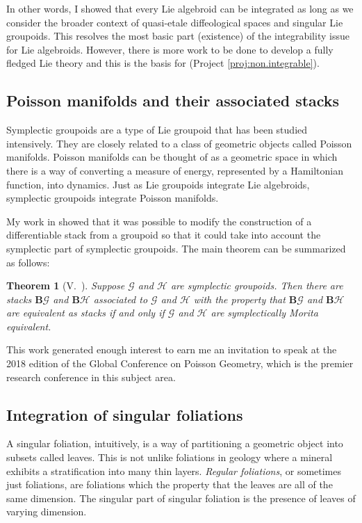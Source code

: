 \documentclass[11pt, letterpaper]{article}
\renewcommand{\H}{\mathcal{H}}
\newcommand{\B}{\mathbf{B}}
\newcommand{\G}{\mathcal{G}}
\newtheorem{theorem}{Theorem}
\begin{document}
In other words, I showed that every Lie algebroid can be integrated as long as we consider the broader context of quasi-etale diffeological spaces and singular Lie groupoids. This resolves the most basic part (existence) of the integrability issue for Lie algebroids. However, there is more work to be done to develop a fully fledged Lie theory and this is the basis for (Project \ref{proj:non.integrable}).

\subsection{Poisson manifolds and their associated stacks}

Symplectic groupoids are a type of Lie groupoid that has been studied intensively. They are closely related to a class of geometric objects called Poisson manifolds. Poisson manifolds can be thought of as a geometric space in which there is a way of converting a measure of energy, represented by a Hamiltonian function, into dynamics. Just as Lie groupoids integrate Lie algebroids, symplectic groupoids integrate Poisson manifolds.

My work in \cite{dman} showed that it was possible to modify the construction of a differentiable stack from a groupoid so that it could take into account the symplectic part of symplectic groupoids. The main theorem can be summarized as follows:
\begin{theorem}[V.~\cite{dman}]\label{thm:dman}
Suppose \( \G \) and \( \H \) are \emph{symplectic} groupoids. Then there are stacks \( \B \G \) and \( \B \H \) associated to \( \G \) and \( \H \) with the property that \( \B \G \) and \( \B \H \) are equivalent as stacks if and only if \( \G \) and \( \H \) are symplectically Morita equivalent.
\end{theorem}
This work generated enough interest to earn me an invitation to speak at the 2018 edition of the Global Conference on Poisson Geometry, which is the premier research conference in this subject area. 

\subsection{Integration of singular foliations}
A singular foliation, intuitively, is a way of partitioning a geometric object into subsets called leaves. This is not unlike foliations in geology where a mineral exhibits a stratification into many thin layers. \emph{Regular foliations}, or sometimes just foliations, are foliations which the property that the leaves are all of the same dimension. The singular part of singular foliation is the presence of leaves of varying dimension.
\end{document}
